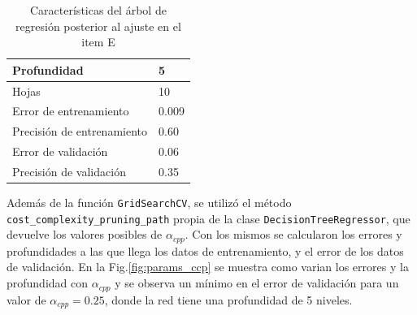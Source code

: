 \begin{table}[H]
	\begin{small}
		\begin{center}
			\begin{tabular}[c]{l|l}
				Profundidad & 5 \\ \hline
				Hojas & 10 \\ \hline
				Error de entrenamiento & 0.009\\ \hline
				Precisión de entrenamiento & 0.60 \\ \hline
				Error de validación & 0.06\\ \hline
				Precisión de validación & 0.35 \\
			\end{tabular}
		\end{center}
	\end{small}
	\caption{Características del árbol de regresión posterior al ajuste en el item E}
	\label{tab:item_E}
\end{table}


Además de la función \verb|GridSearchCV|, se utilizó el método \verb|cost_complexity_pruning_path| propia de la clase \verb|DecisionTreeRegressor|, que devuelve los valores posibles de $\alpha_{cpp}$. Con los mismos se calcularon los errores  y profundidades a las que llega los datos de entrenamiento, y el error de  los datos de validación. En la Fig.\ref{fig:params_ccp} se muestra como varian los errores y la profundidad con $\alpha_{cpp}$ y se observa un mínimo en el error de validación para un valor de $\alpha_{cpp}=0.25$, donde la red tiene una profundidad de 5 niveles.

